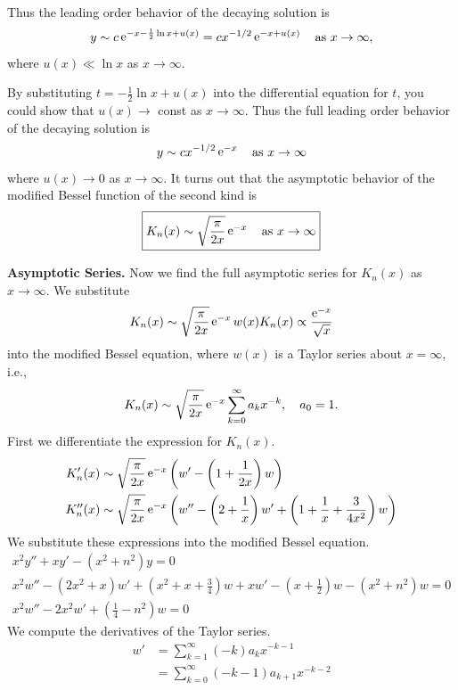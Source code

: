 {\begin{Solution}
  Thus the leading order behavior of the decaying solution is
  \[ 
  y \sim c \mathop{\mathrm{e}}\nolimits^{- x - \frac{1}{2} \ln x + u(x)} = c x^{-1/2}
  \mathop{\mathrm{e}}\nolimits^{- x + u(x)} \quad \mathrm{as}\ x \to \infty,
  \]
  where $u(x) \ll \ln x$ as $x \to \infty$.

  By substituting $t = -\frac{1}{2} \ln x + u(x)$ into the differential 
  equation
  for $t$, you could show that $u(x) \to $ const as $x \to \infty$.  Thus the
  full leading order behavior of the decaying solution is
  \[ 
  y \sim c x^{-1/2} \mathop{\mathrm{e}}\nolimits^{- x} \quad \mathrm{as}\ x \to \infty
  \]
  where $u(x) \to 0$ as $x \to \infty$.  It turns out that the asymptotic 
  behavior of the modified Bessel function of the second kind is
  \[
  \boxed{
    K_n(x) \sim \sqrt{ \frac{\pi}{2 x} } \mathop{\mathrm{e}}\nolimits^{- x}
    \quad \mathrm{as}\ x \to \infty
    }
  \]


  \textbf{Asymptotic Series.}
  Now we find the full asymptotic series for $K_n(x)$ as $x \to \infty$.  
  We substitute
  \[
  K_n(x) \sim \sqrt{ \frac{\pi}{2 x} } \mathop{\mathrm{e}}\nolimits^{- x} w(x)
  K_n(x) \propto \frac{\mathop{\mathrm{e}}\nolimits^{-x}}{\sqrt{x}} 
  \]
  into the modified Bessel equation, where $w(x)$ is a Taylor series about
  $x = \infty$, i.e.,
  \[
  K_n(x) \sim \sqrt{ \frac{\pi}{2 x} } \mathop{\mathrm{e}}\nolimits^{- x} \sum_{k = 0}^\infty a_k x^{-k}, \quad a_0 = 1.
  \]
  First we differentiate the expression for $K_n(x)$.
  \begin{align*}
    K_n'(x) &\sim \sqrt{ \frac{\pi}{2 x} } \mathop{\mathrm{e}}\nolimits^{- x} 
    \left( w' - \left( 1 + \frac{1}{2x} \right) w \right) 
    \\
    K_n''(x) &\sim \sqrt{ \frac{\pi}{2 x} } \mathop{\mathrm{e}}\nolimits^{- x} 
    \left( w'' - \left( 2 + \frac{1}{x} \right) w'
      + \left( 1 + \frac{1}{x} + \frac{3}{4 x^2} \right) w  \right) 
  \end{align*}
  We substitute these expressions into the modified Bessel equation.
  \begin{gather*}
    x^2 y'' + x y' - \left( x^2 + n^2 \right) y = 0 
    \\
    x^2 w'' - \left( 2 x^2 + x \right) w'
    + \left( x^2 + x + \frac{3}{4} \right) w
    + x w' - \left( x + \frac{1}{2} \right) w 
    - \left( x^2 + n^2 \right) w = 0 
    \\
    x^2 w'' - 2 x^2 w' + \left( \frac{1}{4} - n^2 \right) w = 0 
  \end{gather*}
  We compute the derivatives of the Taylor series.
  \begin{align*}
    w' &= \sum_{k = 1}^\infty (-k) a_k x^{-k-1}
    \\
    &= \sum_{k = 0}^\infty (-k-1) a_{k+1} x^{-k-2}

\end{align*}
\end{Solution}}
